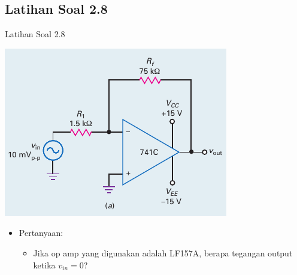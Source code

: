 \subsection{Latihan Soal 2.8}
\begin{frame}[t]{Latihan Soal 2.8}
	\begin{multicols}{2}
		\begin{center}
			\includegraphics[width=\linewidth]{gambar/fig-16.17a}
		\end{center}
		\columnbreak
		\begin{itemize}
			\item Pertanyaan:
			\begin{itemize}
				\item Jika op amp yang digunakan adalah LF157A, berapa tegangan output ketika $ v_{in} = 0 $?
			\end{itemize}
		\end{itemize}
	\end{multicols}
\end{frame}

